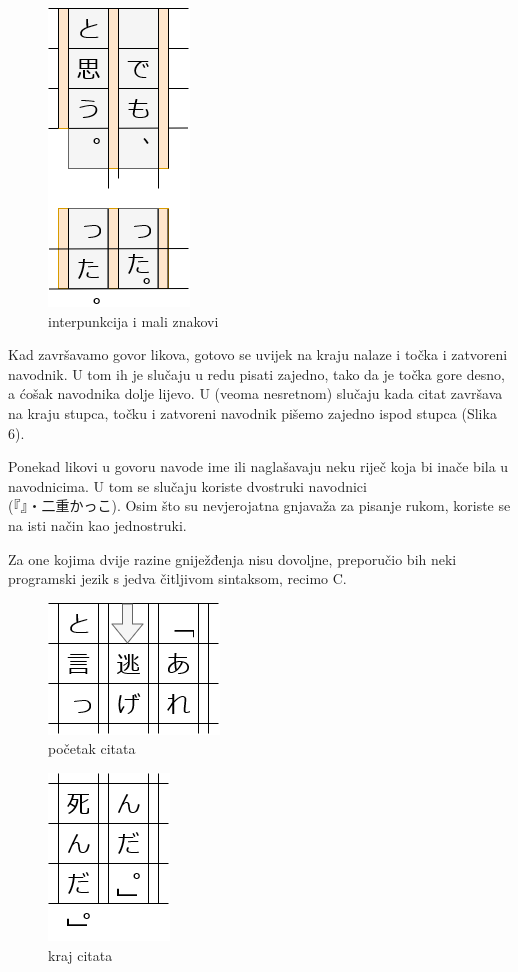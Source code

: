 	\begin{figure}
		\centering
		\includegraphics[width=.15\textwidth]{017_pisanje_res/a5.png}
		\caption{\centering interpunkcija i mali znakovi}
	\end{figure}

	Kad završavamo govor likova, gotovo se uvijek na kraju nalaze i točka i zatvoreni navodnik. U tom ih je slučaju u redu pisati zajedno, tako da je točka gore desno, a ćošak navodnika dolje lijevo. U (veoma nesretnom) slučaju kada citat završava na kraju stupca, točku i zatvoreni navodnik pišemo zajedno ispod stupca (Slika 6).
	
	Ponekad likovi u govoru navode ime ili naglašavaju neku riječ koja bi inače bila u navodnicima. U tom se slučaju koriste dvostruki navodnici\\ (『』・二重かっこ). Osim što su nevjerojatna gnjavaža za pisanje rukom, koriste se na isti način kao jednostruki.
	
	Za one kojima dvije razine gniježđenja nisu dovoljne, preporučio bih neki programski jezik s jedva čitljivom sintaksom, recimo C.
	
	\begin{figure}
		\centering
		\includegraphics[width=.2\textwidth]{017_pisanje_res/b1.png}
		\caption{početak citata}
	\end{figure}
	\begin{figure}
		\centering
		\includegraphics[width=.16\textwidth]{017_pisanje_res/b2.png}
		\caption{kraj citata}
	\end{figure}

